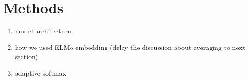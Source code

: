 \section{Methods}
\label{sec: method}

\begin{enumerate}
\item model architecture
\item how we used ELMo embedding (delay the discussion about averaging to next section)
\item adaptive softmax 
\end{enumerate} 